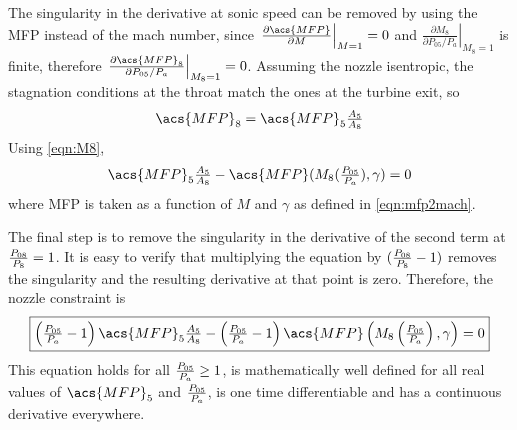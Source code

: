 \documentclass[tcc]{subfiles}
\begin{document}
The singularity in the derivative at sonic speed can be removed by using the \ac{MFP} instead of the mach number, since 
$\left.\frac{\partial\acs{MFP}}{\partial M} \right|_{M=1} = 0$ 
and 
$\left.\frac{\partial M_8}{\partial P_{05}/P_a}\right|_{M_8=1}$ is finite, 
therefore $\left.\frac{\partial\acs{MFP}_8}{\partial P_{05}/P_a}\right|_{M_8=1}=0$.
 Assuming the nozzle isentropic, the stagnation conditions at the throat match the ones at the turbine exit, so
\begin{equation}
    \acs{MFP}_8 = \acs{MFP}_5 \tfrac{A_5}{A_8}
\end{equation}
Using \cref{eqn:M8},
\begin{equation}
    \textstyle
    \acs{MFP}_5 \tfrac{A_5}{A_8} - \acs{MFP}(M_8(\pr{05}{a}), \gamma) = 0
\end{equation}
where \acs{MFP} is taken as a function of $M$ and $\gamma$ as defined in \cref{eqn:mfp2mach}.

The final step is to remove the singularity in the derivative of the second term at $\frac{P_{08}}{P_{8}} = 1$. 
It is easy to verify that multiplying the equation by $(\frac{P_{08}}{P_{8}}-1)$ removes the singularity and the resulting derivative at that point is zero. 
Therefore, the nozzle constraint is
\begin{equation}
    \label{eqn:nozzle}
    \boxed{
    \textstyle
        \left(\pr{05}{a}-1\right)\acs{MFP}_5\frac{A_5}{A_8} - \left(\pr{05}{a}-1\right)\acs{MFP}\left(M_8\left(\pr{05}{a}\right), \gamma\right) = 0
    }
\end{equation}
This equation holds for all $\frac{P_{05}}{P_{a}} \geq 1$, is mathematically well defined for all real values of $\acs{MFP}_5$ and $\frac{P_{05}}{P_{a}}$, is one time differentiable and has a continuous derivative everywhere.
\end{document}
